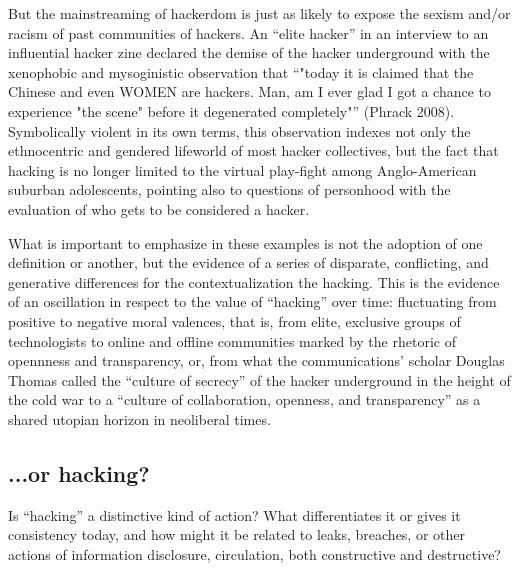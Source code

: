\documentclass[10pt,letter,oneside]{scrartcl}
\begin{document}
But the mainstreaming of hackerdom is just as likely to expose the sexism
and/or racism of past communities of hackers.  An ``elite hacker'' in an
interview to an influential hacker zine declared the demise of the hacker
underground with the xenophobic and mysoginistic observation that ``"today it
is claimed that the Chinese and even WOMEN are hackers. Man, am I ever glad I
got a chance to experience "the scene" before it degenerated completely"''
(Phrack 2008).  Symbolically violent in its own terms, this observation indexes
not only the ethnocentric and gendered lifeworld of most hacker collectives,
but the fact that hacking is no longer limited to the virtual play-fight among
Anglo-American suburban adolescents, pointing also to questions of personhood
with the evaluation of who gets to be considered a hacker.

What is important to emphasize in these examples is not the adoption of one
definition or another, but the evidence of a series of disparate, conflicting,
and generative differences for the contextualization the hacking. This is the
evidence of an oscillation in respect to the value of ``hacking'' over time:
fluctuating from positive to negative moral valences, that is, from elite,
exclusive groups of technologists to online and offline communities marked by
the rhetoric of opennness and transparency, or, from what the communications'
scholar Douglas Thomas called the ``culture of secrecy'' of the hacker
underground in the height of the cold war to a ``culture of collaboration,
openness, and transparency'' as a shared utopian horizon in neoliberal times.

\subsection{...or hacking?}

Is ``hacking'' a distinctive kind of action?  What differentiates it or gives
it consistency today, and how might it be related to leaks, breaches, or other
actions of information disclosure, circulation, both constructive and
destructive?
\end{document}
